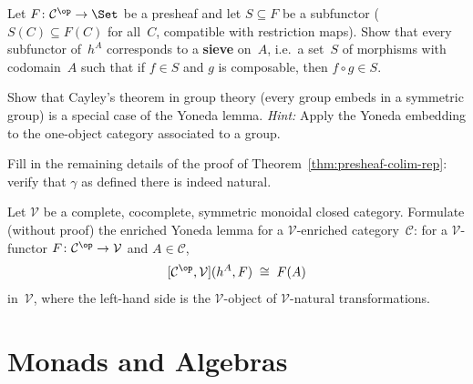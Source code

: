 \begin{exercise}\label{exer:subfunctor}
Let $F\colon\mathcal{C}^{\op}\to\Set$ be a presheaf and let
$S\subseteq F$ be a subfunctor ($S(C)\subseteq F(C)$ for all~$C$,
compatible with restriction maps).  Show that every subfunctor
of~$h^A$ corresponds to a \textbf{sieve} on~$A$, i.e.\ a set~$S$ of
morphisms with codomain~$A$ such that if $f\in S$ and $g$ is composable,
then $f\circ g\in S$.
\end{exercise}

\begin{exercise}\label{exer:cayley-yoneda}
Show that Cayley's theorem in group theory (every group embeds in a
symmetric group) is a special case of the Yoneda lemma.
\emph{Hint:} Apply the Yoneda embedding to the one-object category
associated to a group.
\end{exercise}

\begin{exercise}\label{exer:presheaf-colim-rep}
Fill in the remaining details of the proof of
Theorem~\ref{thm:presheaf-colim-rep}: verify that $\gamma$ as defined
there is indeed natural.
\end{exercise}

\begin{exercise}\label{exer:yoneda-enriched}
Let $\mathcal{V}$ be a complete, cocomplete, symmetric monoidal closed
category.  Formulate (without proof) the enriched Yoneda lemma for a
$\mathcal{V}$-enriched category~$\mathcal{C}$: for a
$\mathcal{V}$-functor $F\colon\mathcal{C}^{\op}\to\mathcal{V}$ and
$A\in\mathcal{C}$,
\[
    [\mathcal{C}^{\op},\mathcal{V}](h^A,F) \;\cong\; F(A)
\]
in~$\mathcal{V}$, where the left-hand side is the $\mathcal{V}$-object
of $\mathcal{V}$-natural transformations.
\end{exercise}




\chapter{Monads and Algebras}\label{ch:monads}
\minitoc

